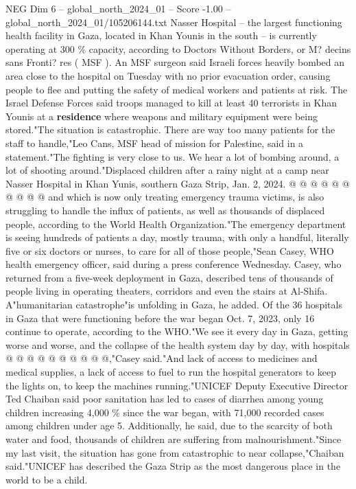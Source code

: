 \begin{textsample}{NEG Dim 6 – global\_north\_2024\_01 – Score -1.00 – global\_north\_2024\_01/105206144.txt}  \label{ex:f6_neg_358}
Nasser Hospital -- the largest functioning health facility in Gaza, located in Khan Younis in the south -- is currently operating at 300 \% capacity, according to Doctors Without Borders, or M? decins sans Fronti? res ( MSF ).
An MSF surgeon said Israeli forces heavily bombed an area close to the hospital on Tuesday with no prior evacuation order, causing people to flee and putting the safety of medical workers and patients at risk.
The Israel Defense Forces said troops managed to kill at least 40 terrorists in Khan Younis at a \textbf{residence} where weapons and military equipment were being stored."The situation is catastrophic.
There are way too many patients for the staff to handle,"Leo Cans, MSF head of mission for Palestine, said in a statement."The fighting is very close to us.
We hear a lot of bombing around, a lot of shooting around."Displaced children after a rainy night at a camp near Nasser Hospital in Khan Yunis, southern Gaza Strip, Jan. 2, 2024. @ @ @ @ @ @ @ @ @ @ and which is now only treating emergency trauma victims, is also struggling to handle the influx of patients, as well as thousands of displaced people, according to the World Health Organization."The emergency department is seeing hundreds of patients a day, mostly trauma, with only a handful, literally five or six doctors or nurses, to care for all of those people,"Sean Casey, WHO health emergency officer, said during a press conference Wednesday.
Casey, who returned from a five-week deployment in Gaza, described tens of thousands of people living in operating theaters, corridors and even the stairs at Al-Shifa.
A"humanitarian catastrophe"is unfolding in Gaza, he added.
Of the 36 hospitals in Gaza that were functioning before the war began Oct. 7, 2023, only 16 continue to operate, according to the WHO."We see it every day in Gaza, getting worse and worse, and the collapse of the health system day by day, with hospitals @ @ @ @ @ @ @ @ @ @,"Casey said."And lack of access to medicines and medical supplies, a lack of access to fuel to run the hospital generators to keep the lights on, to keep the machines running."UNICEF Deputy Executive Director Ted Chaiban said poor sanitation has led to cases of diarrhea among young children increasing 4,000 \% since the war began, with 71,000 recorded cases among children under age 5.
Additionally, he said, due to the scarcity of both water and food, thousands of children are suffering from malnourishment."Since my last visit, the situation has gone from catastrophic to near collapse,"Chaiban said."UNICEF has described the Gaza Strip as the most dangerous place in the world to be a child.

\end{textsample}
